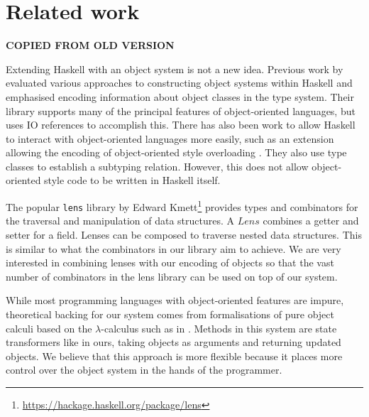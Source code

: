 

\section{Related work}
\label{sec:related}

\textbf{COPIED FROM OLD VERSION}

Extending Haskell with an object system is not a new idea. Previous work by \citet{kiselyov2005haskell} evaluated various approaches to constructing object systems within Haskell and emphasised encoding information about object classes in the type system. Their library supports many of the principal features of object-oriented languages, but uses IO references to accomplish this. There has also been work to allow Haskell to interact with object-oriented languages more easily, such as an extension allowing the encoding of object-oriented style overloading \cite{shields2001object}. They also use type classes to establish a subtyping relation. However, this does not allow object-oriented style code to be written in Haskell itself.

The popular \texttt{lens} library by Edward Kmett\footnote{\url{https://hackage.haskell.org/package/lens}} provides types and combinators for the traversal and manipulation of data structures. A $\mathit{Lens}$ combines a getter and setter for a field. Lenses can be composed to traverse nested data structures. This is similar to what the combinators in our library aim to achieve. We are very interested in combining lenses with our encoding of objects so that the vast number of combinators in the lens library can be used on top of our system. 

While most programming languages with object-oriented features are impure, theoretical backing for our system comes from formalisations of pure object calculi based on the $\lambda$-calculus such as in \citet{pierce1994simple}. Methods in this system are state transformers like in ours, taking objects as arguments and returning updated objects. We believe that this approach is more flexible because it places more control over the object system in the hands of the programmer.


